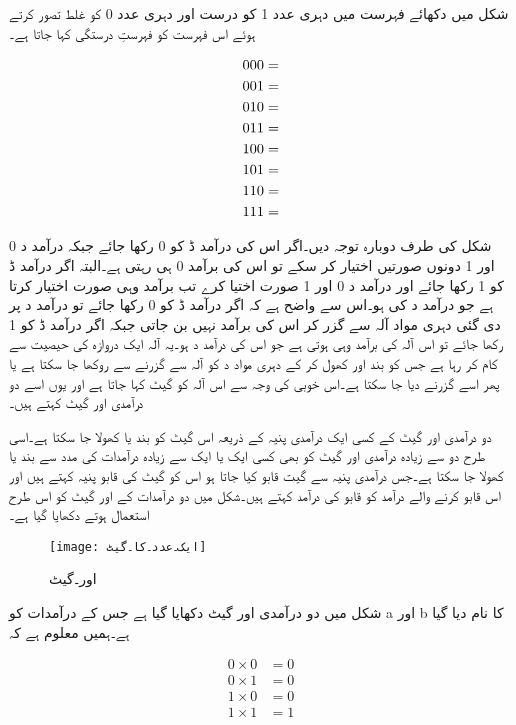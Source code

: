 شکل میں دکھائے فہرست میں دہری عدد 1 کو درست اور دہری عدد 0 کو غلط تصور کرتے ہوئے اس فہرست کو فہرستِ درستگی  کہا جاتا ہے۔ 

\begin{align}  \label{مساوات۔تین۔دہری۔اعداد۔کی۔گنتی}
000=  \notag \\
001=  \notag \\
010=  \notag \\
011=  \notag \\
100=  \notag \\
101=  \notag \\
110=  \notag \\
111= 
\end{align}

شکل  کی طرف دوبارہ توجہ دیں۔اگر اس کی درآمد ڈ کو 0 رکھا جائے جبکہ درآمد د 0 اور 1 دونوں صورتیں اختیار کر سکے تو اس کی برآمد 0 ہی رہتی ہے۔البتہ اگر درآمد ڈ کو 1 رکھا جائے اور درآمد د 0 اور 1 صورت اختیا کرے تب برآمد وہی صورت اختیار کرتا ہے جو درآمد د کی ہو۔اس سے واضح ہے کہ اگر درآمد ڈ کو 0 رکھا جائے تو درآمد د پر دی گئی دہری مواد آلہ سے گزر کر اس کی برآمد نہیں بن جاتی جبکہ اگر درآمد ڈ کو 1 رکھا جائے تو اس آلہ کی برآمد وہی ہوتی ہے جو اس کی درآمد د ہو۔یہ آلہ ایک دروازہ کی حیصیت سے کام کر رہا ہے جس کو بند اور کھول کر کے دہری مواد د کو آلہ سے گزرنے سے روکھا جا سکتا ہے یا پھر اسے گزرنے دیا جا سکتا ہے۔اس خوبی کی وجہ سے اس آلہ کو گیٹ کہا جاتا ہے اور یوں اسے دو درآمدی اور گیٹ کہتے ہیں۔

دو درآمدی اور گیٹ کے کسی ایک درآمدی پنیہ کے ذریعہ اس گیٹ کو بند یا کھولا جا سکتا ہے۔اسی طرح دو سے زیادہ درآمدی اور گیٹ کو بھی کسی ایک یا ایک سے زیادہ درآمدات کی مدد سے بند یا کھولا جا سکتا ہے۔جس درآمدی پنیہ سے گیت قابو کیا جاتا ہو اس کو گیٹ کی قابو پنیہ  کہتے ہیں اور اس قابو کرنے والے درآمد کو قابو کی درآمد  کہتے ہیں۔شکل  میں دو درآمدات کے اور گیٹ کو اس طرح استعمال ہوتے دکھایا گیا ہے۔


\begin{figure}[th]
 \begin{center}
  \texttt{[image: ایک۔عدد۔کا۔گیٹ]}
 \end{center}
\caption{اور۔گیٹ}
\label{شکل۔ایک۔عدد۔کا۔گیٹ}
\end{figure}

شکل  میں دو درآمدی اور گیٹ دکھایا گیا ہے جس کے درآمدات کو a اور b کا نام دیا گیا ہے۔ہمیں معلوم ہے کہ 


\begin{align*}
0 \times 0 &=0 \\
0 \times 1 &=0 \\
1 \times 0 &=0 \\
1 \times 1 &=1
\end{align*}


